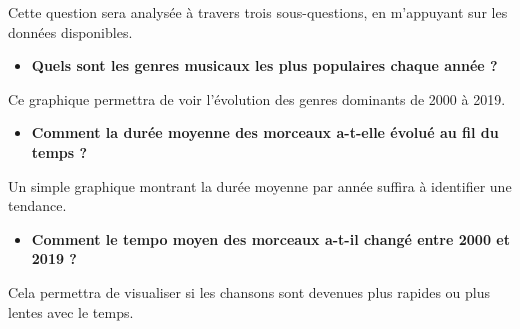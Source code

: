 \documentclass[french]{article}
\newcommand{\newLine}{\vspace{0.2cm}}
\begin{document}
Cette question sera analysée à travers trois sous-questions, en m'appuyant sur les données disponibles. \newLine

\begin{itemize}
	\item \textbf{Quels sont les genres musicaux les plus populaires chaque année ?}
\end{itemize}

Ce graphique permettra de voir l'évolution des genres dominants de 2000 à 2019. \newLine

\begin{itemize}
	\item \textbf{Comment la durée moyenne des morceaux a-t-elle évolué au fil du temps ?}
\end{itemize}

Un simple graphique montrant la durée moyenne par année suffira à identifier une tendance. \newLine

\begin{itemize}
	\item \textbf{Comment le tempo moyen des morceaux a-t-il changé entre 2000 et 2019 ?}
\end{itemize}

Cela permettra de visualiser si les chansons sont devenues plus rapides ou plus lentes avec le temps.
\end{document}
